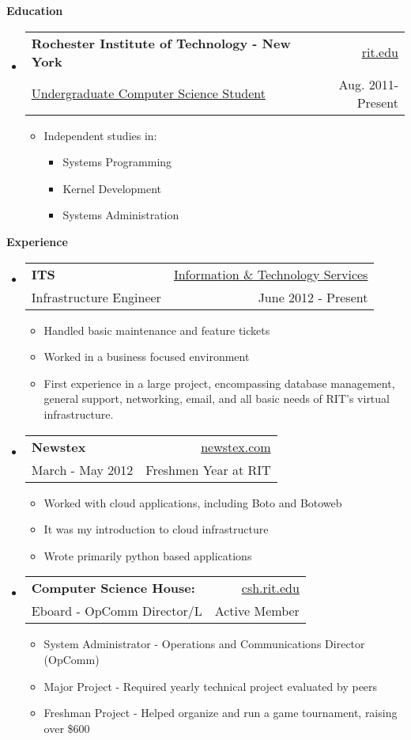 \documentclass[letterpaper,11pt]{article}
\makeatletter
\newcommand{\resitem}[1]{\item #1 \vspace{-2pt}}
\newcommand{\resheading}[1]{{\large \colorbox{mygrey}{\begin{minipage}{\textwidth}{\textbf{#1 \vphantom{p\^{E}}}}\end{minipage}}}}
\newcommand{\ressubheading}[4]{
\begin{tabular*}{6.5in}{l@{\extracolsep{\fill}}r}
		\textbf{#1} & #2 \\
		{#3} & {#4} \\
\end{tabular*}\vspace{-6pt}}
\makeatother
\begin{document}
\resheading{Education}
	{ \footnotesize
	\begin{itemize}
		\item
			\ressubheading{Rochester Institute of Technology - New York}{\href{http://www.rit.edu/}{rit.edu}}{\href{http://www.cs.rit.edu/}{Undergraduate Computer Science Student}}{Aug. 2011-Present}
				{ \footnotesize
				\begin{itemize}
				\footnotesize
					\resitem{Independent studies in:}
					\begin{itemize}
						\item{Systems Programming}
						\item{Kernel Development} 
						\item{Systems Administration}
					\end{itemize}					 
				\end{itemize}
				}
	\end{itemize} %
	}
\resheading{Experience}
{\footnotesize
	\begin{itemize}
			\item 
			\ressubheading{ITS}{\href{http://www.rit.edu/its/}{Information \& Technology Services}}{Infrastructure Engineer}{June 2012 - Present}
			{ \footnotesize
				\begin{itemize}
					\item{Handled basic maintenance and feature tickets}
					\item{Worked in a business focused environment}
					\item{First experience in a large project, encompassing database management, general support, networking, email, and all basic needs of RIT's virtual infrastructure.}
				\end{itemize}
			}
		\item	
			\ressubheading{Newstex}{\href{http://www.newstex.com/}{newstex.com}}{March - May 2012}{Freshmen Year at RIT} 
				{ \footnotesize 
				\begin{itemize}
					\item{Worked with cloud applications, including Boto and Botoweb}
					\item{It was my introduction to cloud infrastructure}
					\item{Wrote primarily python based applications}
				\end{itemize}
				}
		\item 
			\ressubheading{Computer Science House:}{\href{http://www.csh.rit.edu/}{csh.rit.edu}}{Eboard - OpComm Director/L}{Active Member} 
			{ \footnotesize
				\begin{itemize}		
					\resitem{{System Administrator} - Operations and Communications Director (OpComm)}
					\resitem{{Major Project} - Required yearly technical project evaluated by peers}
					\resitem{{Freshman Project} - Helped organize and run a game tournament, raising over \$600} 
					
				\end{itemize}
			}		
	\end{itemize}  %
}
\end{document}
